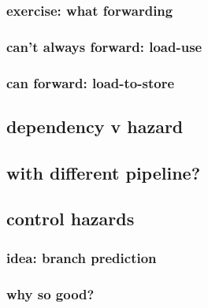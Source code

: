 \subsubsection{exercise: what forwarding}


\subsubsection{can't always forward: load-use}


\subsubsection{can forward: load-to-store}




\subsection{dependency v hazard}




\subsection{with different pipeline?}


\subsection{control hazards}

\subsubsection{idea: branch prediction}



\subsubsection{why so good?}


